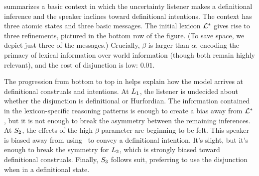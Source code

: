 \documentclass[12pt,twoside]{article}
\renewcommand{\_}{\textbf{\textunderscore\hspace{-4pt}\textunderscore\hspace{-3pt}\textunderscore\hspace{-4pt}\textunderscore}\hspace{0.5pt}}			%
\begin{document}
 summarizes a basic context in which the uncertainty
listener makes a definitional inference and the speaker inclines
toward definitional intentions. The context has three atomic states
and three basic messages. The initial lexicon $\LexStar$ gives rise to
three refinements, pictured in the bottom row of the figure. (To save
space, we depict just three of the messages.)  Crucially, $\beta$ is
larger than $\alpha$, encoding the primacy of lexical information over
world information (though both remain highly relevant), and the cost
of disjunction is low: $0.01$.

The progression from bottom to top in  helps explain
how the model arrives at definitional construals and intentions.  At
$\ListenerK[1]$, the listener is undecided about whether the
disjunction is definitional or Hurfordian. The information contained
in the lexicon-specific reasoning patterns is enough to create a bias
away from $\LexStar$, but it is not enough to break the asymmetry
between the remaining inferences. At $\SpeakerK[2]$, the effects of
the high $\beta$ parameter are beginning to be felt. This speaker is
biased away from using \AorX\ to convey a definitional
intention. It's slight, but it's enough to break the symmetry for
$\ListenerK[2]$, which is strongly biased toward definitional
construals. Finally, $\SpeakerK[3]$ follows suit, preferring to use
the disjunction when in a definitional state.
\end{document}
